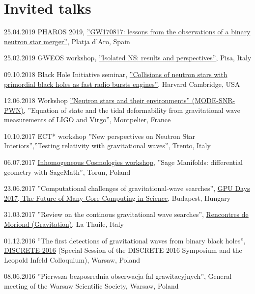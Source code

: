\documentclass[]{friggeri-cv} %
\begin{document}
\section{Invited talks}
\begin{entrylistoc}

\entrys 
{25.04.2019} 
{{PHAROS 2019}, \href{https://indico.ice.csic.es/event/12/page/12-final-program}{''GW170817: lessons from the observations of a binary neutron star merger''}, {Platja d'Aro, Spain}}  

\entrys 
{25.02.2019} 
{{GWEOS workshop}, \href{https://agenda.infn.it/event/17643/timetable/\#20190225}{''Isolated NS: results and perspectives''}, {Pisa, Italy}} 

\entrys 
{09.10.2018} 
{{Black Hole Initiative seminar}, \href{https://arxiv.org/abs/1704.05931}{''Collisions of neutron stars with primordial black holes as fast radio bursts engines''}, {Harvard Cambridge, USA}} 

\entrys
{12.06.2018}
{{Workshop \href{https://mode2018.sciencesconf.org/program}{''Neutron stars and their environments'' (MODE-SNR-PWN)}}, {''Equation of state and the tidal deformability from gravitational wave measurements of LIGO and Virgo'', Montpelier, France}}

\entrys 
{10.10.2017} 
{{ECT* workshop ''New perspectives on Neutron Star Interiors''},{''Testing relativity with gravitational waves'', Trento, Italy}} 

\entrys
{06.07.2017} 
{\href{https://cosmo.torun.pl/cosmotorun17.html}{Inhomogeneous Cosmologies workshop}, ''Sage Manifolds: differential geometry with SageMath'', Torun, Poland} 

\entrys 
{23.06.2017}
{''Computational challenges of gravitational-wave searches'', \href{http://gpuday.com}{GPU Days 2017, The Future of Many-Core Computing in Science}, Budapest, Hungary} 

\entrys 
{31.03.2017}
{''Review on the continous gravitational wave searches'', \href{http://moriond.in2p3.fr/grav/2017/program.php\#Friday}{Rencontres de Moriond (Gravitation)}, La Thuile, Italy}

\entrys 
{01.12.2016}
{''The first detections of gravitational waves from binary black holes'', \href{http://indico.fuw.edu.pl/sessionDisplay.py?contribId=57\&sessionId=44\&confId=46\#20161201}{DISCRETE 2016} (Special Session of the DISCRETE 2016 Symposium and the Leopold Infeld Colloquium), Warsaw, Poland}

\entrys 
{08.06.2016} 
{''Pierwsza bezposrednia obserwacja fal grawitacyjnych'', General meeting of the Warsaw Scientific Society, Warsaw, Poland} 


\end{entrylistoc}
\end{document}
